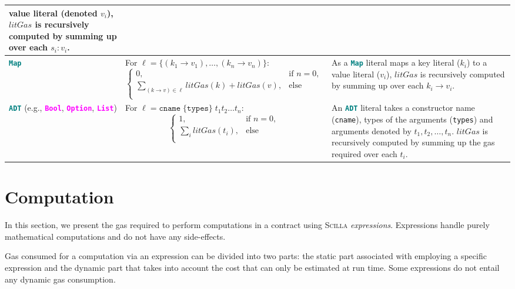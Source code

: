 \documentclass[9pt]{article}
\begin{document}
\begin{table}[!hbt]
\begin{tabular}{|p{3cm}|p{6.7cm}|p{6cm}|}
		value literal (denoted $v_i$), $litGas$
		is recursively computed by summing up over each $s_i : v_i$.   \\ \hline
		\textbf{\texttt{\textcolor{teal}{Map}}} &
		For $\ell = \{(k_1 \rightarrow v_1), 
		\ldots, (k_n \rightarrow v_n)\}$:
		$$ \begin{cases}
    		0, & \text{if } n = 0,  \\
  			\sum_{(k \rightarrow v) \in \ell} {litGas(k) + litGas(v)},  &
    		\text{else } \\
  \end{cases}
		$$ & As a \textbf{\texttt{\textcolor{teal}{Map}}} literal maps a key literal ($k_i$) to a
		value literal ($v_i$),  $litGas$
		is recursively computed by summing up over each $k_i \rightarrow v_i$. \\ \hline
		\textbf{\texttt{\textcolor{teal}{ADT}}} (e.g.,
		\textbf{\textcolor{magenta}{\texttt{Bool}}},
		\textbf{\textcolor{magenta}{\texttt{Option}}},
		\textbf{\textcolor{magenta}{\texttt{List}}}) & For $\ell = \texttt{cname}\;
		\{\texttt{types}\} \; t_1 t_2 \ldots t_n $:
		$$ \begin{cases}
    		1, & \text{if } n = 0,  \\
  			\sum_{i} {litGas(t_i)},  &
    		\text{else } \\
  		\end{cases}
		$$ 
		
		& An \textbf{\texttt{\textcolor{teal}{ADT}}} literal takes a constructor name
		(\texttt{cname}), types of the arguments (\texttt{types}) and arguments
		denoted by $t_1, t_2, \ldots, t_n$. $litGas$ is recursively computed
		by summing up the gas required over each $t_i$. \\ \hline
	\end{tabular}
	\end{table}
 
\section{Computation}

In this section, we present the gas required to perform computations in a contract
using \textsc{Scilla} \emph{expressions}. Expressions handle purely
mathematical computations and do not have any side-effects. 

Gas consumed for a computation via an expression can be divided into two parts: the
static part associated with employing a specific expression and the dynamic
part that takes into account the cost that can only be estimated at run time.
Some expressions do not entail any dynamic gas consumption.
\end{document}
